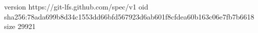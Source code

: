 version https://git-lfs.github.com/spec/v1
oid sha256:78ada699b8d34c1553dd66bfd567923d6ab601f8cfdea60b163c06e7fb7b6618
size 29921
